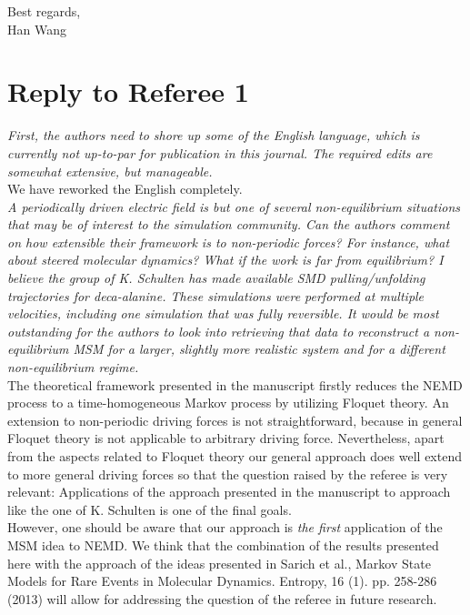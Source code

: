 \documentclass{article}
\begin{document}
\noindent Best regards,\\
Han Wang

\vskip 1cm
\newpage
\section*{Reply to Referee 1}

\textit{ First, the authors need to shore up some of the English
  language, which is currently not up-to-par for publication in this
  journal.  The required edits are somewhat extensive, but manageable.}\\

We have reworked the English completely.\\

\textit{
A periodically driven electric field is but one of several
non-equilibrium situations that may be of interest to the simulation
community.  Can the authors comment on how extensible their framework
is to non-periodic forces?  For instance, what about steered molecular
dynamics?  What if the work is far from equilibrium?  I believe the
group of K. Schulten has made available SMD pulling/unfolding
trajectories for deca-alanine. These simulations were performed at
multiple velocities, including one simulation that was fully
reversible.  It would be most outstanding for the authors to look into
retrieving that data to reconstruct a non-equilibrium MSM for a
larger, slightly more realistic system and for a different
non-equilibrium regime.
}\\

The theoretical framework presented in the manuscript firstly reduces the NEMD process to a
time-homogeneous Markov process by utilizing Floquet theory.  An extension
to non-periodic driving forces is not straightforward, because in
general Floquet theory is not applicable to arbitrary driving
force. Nevertheless, apart from the aspects related to Floquet theory our general approach does well extend to more general driving forces so that
the question raised by the referee is very relevant: Applications of the approach presented in the manuscript to approach like the one of K. Schulten is one of the final goals. \\

However, one should be aware that our approach is \emph{the first} application of the MSM idea to NEMD. We think that the combination of the results presented here with the approach of the ideas presented in Sarich et al., Markov State Models for Rare Events in Molecular Dynamics. Entropy, 16 (1). pp. 258-286 (2013)  will allow for addressing the question of the referee in future research.\\
\end{document}
